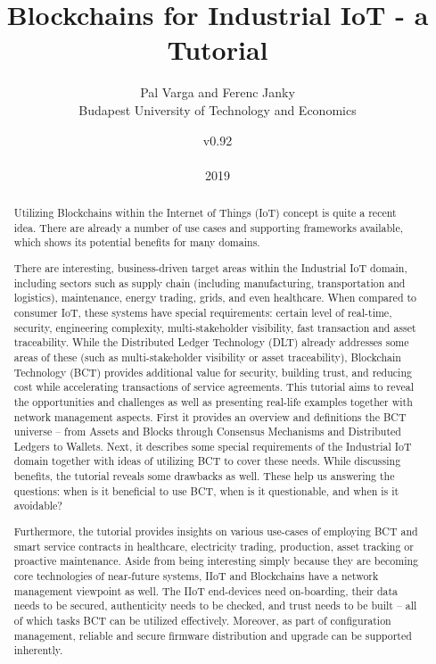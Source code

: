 \documentclass[a4paper]{article}
\title{Blockchains for Industrial IoT - a Tutorial}
\author{Pal Varga and Ferenc Janky \\ Budapest University of Technology and Economics}
\date{v0.92 \\ \\ 2019}
\begin{document}
\maketitle

\begin{abstract}
Utilizing Blockchains within the Internet of Things (IoT) concept is quite a recent idea. There are already a number of use cases and supporting frameworks available, which shows its potential benefits for many domains.

There are interesting, business-driven target areas within the Industrial IoT domain, including sectors such as supply chain (including manufacturing, transportation and logistics), maintenance, energy trading, grids, and even healthcare. When compared to consumer IoT, these systems have special requirements: certain level of real-time, security, engineering complexity, multi-stakeholder visibility, fast transaction and asset traceability. While the Distributed Ledger Technology (DLT) already addresses some areas of these (such as multi-stakeholder visibility or asset traceability), Blockchain Technology (BCT) provides additional value for security, building trust, and reducing cost while accelerating transactions of service agreements.
This tutorial aims to reveal the opportunities and challenges as well as presenting real-life examples together with network management aspects. First it provides an overview and definitions the BCT universe – from Assets and Blocks through Consensus Mechanisms and Distributed Ledgers to Wallets. Next, it describes some special requirements of the Industrial IoT domain together with ideas of utilizing BCT to cover these needs. While discussing benefits, the tutorial reveals some drawbacks as well. These help us answering the questions: when is it beneficial to use BCT, when is it questionable, and when is it avoidable?

Furthermore, the tutorial provides insights on various use-cases of employing BCT and smart service contracts in healthcare, electricity trading, production, asset tracking or proactive maintenance. Aside from being interesting simply because they are becoming core technologies of near-future systems, IIoT and Blockchains have a network management viewpoint as well. The IIoT end-devices need on-boarding, their data needs to be secured, authenticity needs to be checked, and trust needs to be built – all of which tasks BCT can be utilized effectively. Moreover, as part of configuration management, reliable and secure firmware distribution and upgrade can be supported inherently.


\end{abstract}
\end{document}
